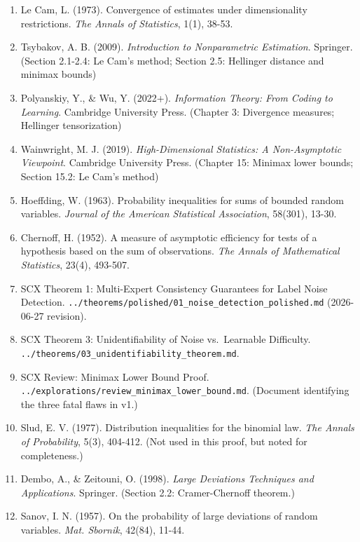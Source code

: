 \documentclass[
  12pt,
]{article}
\begin{document}
\begin{enumerate}
\def\labelenumi{\arabic{enumi}.}
\item
  Le Cam, L. (1973). Convergence of estimates under dimensionality
  restrictions. \emph{The Annals of Statistics}, 1(1), 38-53.
\item
  Tsybakov, A. B. (2009). \emph{Introduction to Nonparametric
  Estimation}. Springer. (Section 2.1-2.4: Le Cam's method; Section 2.5:
  Hellinger distance and minimax bounds)
\item
  Polyanskiy, Y., \& Wu, Y. (2022+). \emph{Information Theory: From
  Coding to Learning}. Cambridge University Press. (Chapter 3:
  Divergence measures; Hellinger tensorization)
\item
  Wainwright, M. J. (2019). \emph{High-Dimensional Statistics: A
  Non-Asymptotic Viewpoint}. Cambridge University Press. (Chapter 15:
  Minimax lower bounds; Section 15.2: Le Cam's method)
\item
  Hoeffding, W. (1963). Probability inequalities for sums of bounded
  random variables. \emph{Journal of the American Statistical
  Association}, 58(301), 13-30.
\item
  Chernoff, H. (1952). A measure of asymptotic efficiency for tests of a
  hypothesis based on the sum of observations. \emph{The Annals of
  Mathematical Statistics}, 23(4), 493-507.
\item
  SCX Theorem 1: Multi-Expert Consistency Guarantees for Label Noise
  Detection.
  \texttt{../theorems/polished/01\_noise\_detection\_polished.md}
  (2026-06-27 revision).
\item
  SCX Theorem 3: Unidentifiability of Noise vs.~Learnable Difficulty.
  \texttt{../theorems/03\_unidentifiability\_theorem.md}.
\item
  SCX Review: Minimax Lower Bound Proof.
  \texttt{../explorations/review\_minimax\_lower\_bound.md}. (Document
  identifying the three fatal flaws in v1.)
\item
  Slud, E. V. (1977). Distribution inequalities for the binomial law.
  \emph{The Annals of Probability}, 5(3), 404-412. (Not used in this
  proof, but noted for completeness.)
\item
  Dembo, A., \& Zeitouni, O. (1998). \emph{Large Deviations Techniques
  and Applications}. Springer. (Section 2.2: Cramer-Chernoff theorem.)
\item
  Sanov, I. N. (1957). On the probability of large deviations of random
  variables. \emph{Mat. Sbornik}, 42(84), 11-44.
\end{enumerate}
\end{document}
